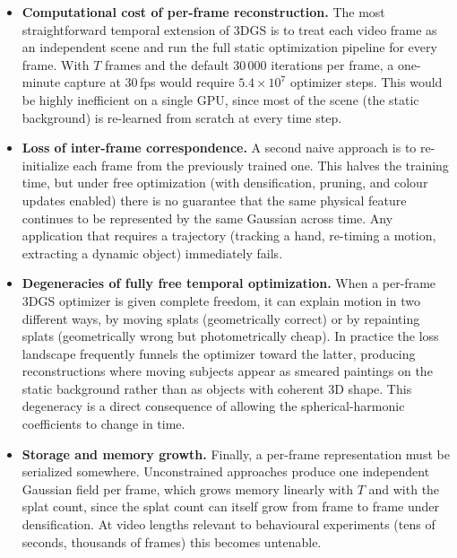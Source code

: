 \begin{itemize}
    \item \textbf{Computational cost of per-frame reconstruction.} The most
    straightforward temporal extension of 3DGS is to treat each video frame as
    an independent scene and run the full static optimization pipeline for every
    frame. With $T$ frames and the default $30\,000$ iterations per frame, a
    one-minute capture at $30$\,fps would require $5.4 \times 10^{7}$ optimizer
    steps. This would be highly inefficient on a single GPU, since most of the
    scene (the static background) is re-learned from scratch at every time
    step.

    \item \textbf{Loss of inter-frame correspondence.} A second naive approach
    is to re-initialize each frame from the previously trained one. This halves
    the training time, but under free optimization (with densification, pruning,
    and colour updates enabled) there is no guarantee that the same physical
    feature continues to be represented by the same Gaussian across time. Any
    application that requires a trajectory (tracking a hand, re-timing a motion,
    extracting a dynamic object) immediately fails.

    \item \textbf{Degeneracies of fully free temporal optimization.} When a
    per-frame 3DGS optimizer is given complete freedom, it can explain motion in
    two different ways, by moving splats (geometrically correct) or by repainting
    splats (geometrically wrong but photometrically cheap). In
    practice the loss landscape frequently funnels the optimizer toward the
    latter, producing reconstructions where moving subjects appear as smeared
    paintings on the static background rather than as objects with coherent 3D
    shape. This degeneracy is a direct consequence of allowing the
    spherical-harmonic coefficients to change in time.

    \item \textbf{Storage and memory growth.} Finally, a per-frame
    representation must be serialized somewhere. Unconstrained approaches
    produce one independent Gaussian field per frame, which grows memory
    linearly with $T$ and with the splat count, since the splat count can itself
    grow from frame to frame under densification. At video lengths relevant to
    behavioural experiments (tens of seconds, thousands of frames) this becomes
    untenable.

\end{itemize}


